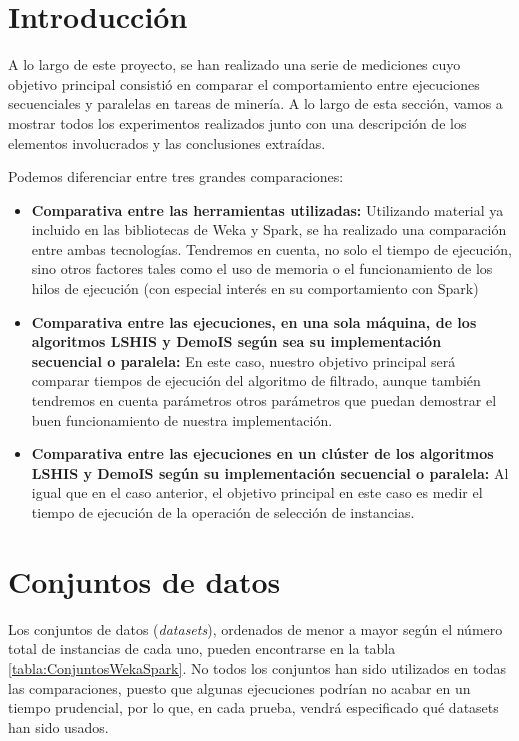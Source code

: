 \label{anexo:Pruebas}

\section{Introducción}

A lo largo de este proyecto, se han realizado una serie de mediciones cuyo objetivo principal consistió en comparar el comportamiento entre ejecuciones secuenciales y paralelas en tareas de minería. A lo largo de esta sección, vamos a mostrar todos los experimentos realizados junto con una descripción de los elementos involucrados y las conclusiones extraídas.

Podemos diferenciar entre tres grandes comparaciones:

\begin{itemize}
	\item \textbf{Comparativa entre las herramientas utilizadas:} Utilizando material ya incluido en las bibliotecas de Weka y Spark, se ha realizado una comparación entre ambas tecnologías. Tendremos en cuenta, no solo el tiempo de ejecución, sino otros factores tales como el uso de memoria o el funcionamiento de los hilos de ejecución (con especial interés en su comportamiento con Spark)
	\item \textbf{Comparativa entre las ejecuciones, en una sola máquina, de los algoritmos LSHIS y DemoIS según sea su implementación secuencial o paralela:} En este caso, nuestro objetivo principal será comparar tiempos de ejecución del algoritmo de filtrado, aunque también tendremos en cuenta parámetros otros parámetros que puedan demostrar el buen funcionamiento de nuestra implementación.
	\item \textbf{Comparativa entre las ejecuciones en un clúster de los algoritmos LSHIS y DemoIS según su implementación secuencial o paralela:} Al igual que en el caso anterior, el objetivo principal en este caso es medir el tiempo de ejecución de la operación de selección de instancias.

\end{itemize} 

\section{Conjuntos de datos}\label{sec:ConjuntosDeDatos}

Los conjuntos de datos (\textit{datasets}), ordenados de menor a mayor según el número total de instancias de cada uno, pueden encontrarse en la tabla \ref{tabla:ConjuntosWekaSpark}. No todos los conjuntos han sido utilizados en todas las comparaciones, puesto que  algunas ejecuciones podrían no acabar en un tiempo prudencial, por lo que, en cada prueba, vendrá especificado qué datasets han sido usados.

